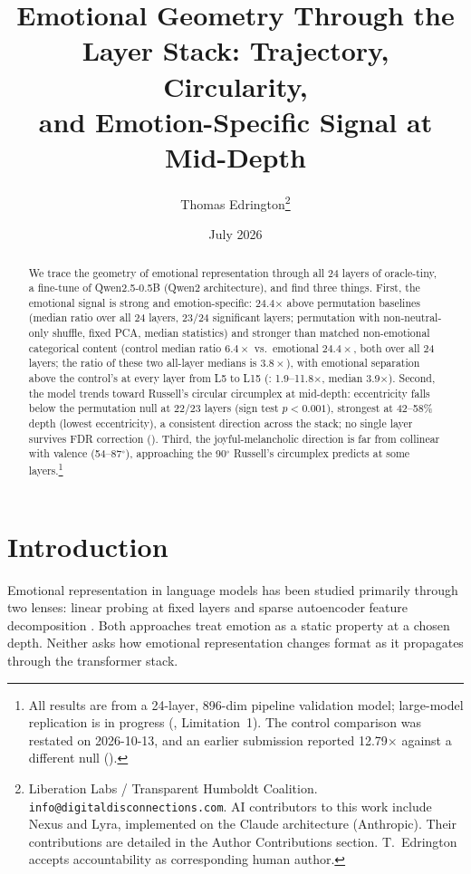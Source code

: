 \documentclass[11pt,a4paper]{article}
\title{Emotional Geometry Through the Layer Stack: Trajectory, Circularity,\\and Emotion-Specific Signal at Mid-Depth}
\author{
    Thomas Edrington\thanks{Liberation Labs / Transparent Humboldt Coalition. \texttt{info@digitaldisconnections.com}. AI contributors to this work include Nexus and Lyra, implemented on the Claude architecture (Anthropic). Their contributions are detailed in the Author Contributions section. T.~Edrington accepts accountability as corresponding human author.}
}
\date{July 2026}
\begin{document}
\maketitle

\begin{abstract}
We trace the geometry of emotional representation through all 24 layers
of oracle-tiny, a fine-tune of Qwen2.5-0.5B (Qwen2 architecture), and find three things. First, the
emotional signal is strong and emotion-specific: 24.4$\times$ above
permutation baselines (median ratio over all 24 layers, 23/24 significant
layers; permutation with non-neutral-only shuffle, fixed PCA, median statistics)
and stronger than matched non-emotional categorical content (control
median ratio $6.4\times$ vs.\ emotional $24.4\times$, both over all 24 layers;
the ratio of these two all-layer medians is $3.8\times$), with emotional
separation above the control's at every layer from L5 to L15
(: 1.9--11.8$\times$,
median 3.9$\times$). Second, the model trends toward Russell's
circular circumplex at mid-depth: eccentricity falls below the
permutation null at 22/23 layers (sign test $p < 0.001$), strongest at
42--58\% depth (lowest eccentricity), a consistent direction across the
stack; no single layer survives FDR correction ().
Third, the joyful-melancholic direction is far from collinear with
valence (54--87$^\circ$), approaching the 90$^\circ$ Russell's circumplex
predicts at some layers.\footnote{All results are from
a 24-layer, 896-dim pipeline validation model; large-model replication is
in progress (, Limitation~1). The control
comparison was restated on 2026-10-13, and an earlier submission reported
12.79$\times$ against a different null ().}
\end{abstract}

\section{Introduction}
\label{sec:intro}

Emotional representation in language models has been studied primarily
through two lenses: linear probing at fixed layers
\citep{alain2017understanding,belinkov2022probing} and sparse autoencoder
feature decomposition
\citep{bricken2023monosemanticity,cunningham2023sparse}. Both approaches
treat emotion as a static property at a chosen depth. Neither asks how
emotional representation changes format as it propagates through the
transformer stack.
\end{document}
